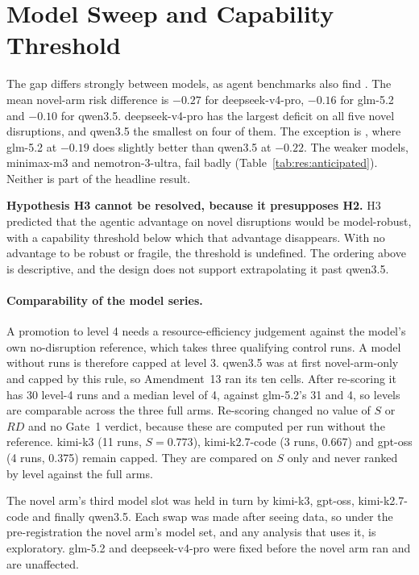 \section{Model Sweep and Capability Threshold}
\label{sec:res:models}

The gap differs strongly between models, as agent benchmarks also find
\parencite{xu2025}. The mean novel-arm risk
difference is $-0.27$ for deepseek-v4-pro, $-0.16$ for glm-5.2 and $-0.10$ for
qwen3.5. deepseek-v4-pro has the largest deficit on all five novel
disruptions, and qwen3.5 the smallest on four of them. The exception is
, where glm-5.2 at $-0.19$ does slightly
better than qwen3.5 at $-0.22$. The weaker models, minimax-m3 and
nemotron-3-ultra, fail badly (Table~\ref{tab:res:anticipated}). Neither is
part of the headline result.

\textbf{Hypothesis H3 cannot be resolved, because it presupposes H2.} H3
predicted that the agentic advantage on novel disruptions would be
model-robust, with a capability threshold below which that advantage
disappears. With no advantage to be robust or fragile, the threshold is
undefined. The ordering above is descriptive, and the design does not support
extrapolating it past qwen3.5.

\paragraph{Comparability of the model series.}
\label{sec:res:models:levelcap}
\label{sec:res:models:churn}
A promotion to level 4 needs a resource-efficiency judgement against the
model's own no-disruption reference, which takes three qualifying control runs.
A model without  runs is therefore capped at level 3.
qwen3.5 was at first novel-arm-only and capped by this rule, so Amendment~13
ran its ten  cells. After re-scoring it has 30 level-4 runs
and a median level of 4, against glm-5.2's 31 and 4, so levels are comparable
across the three full arms. Re-scoring changed no value of $S$ or $RD$ and no
Gate~1 verdict, because these are computed per run without the reference.
kimi-k3 (11 runs, $S = 0.773$), kimi-k2.7-code (3 runs, 0.667) and gpt-oss
(4 runs, 0.375) remain capped. They are compared on $S$ only and never ranked
by level against the full arms.

The novel arm's third model slot was held in turn by kimi-k3, gpt-oss,
kimi-k2.7-code and finally qwen3.5. Each swap was made after seeing data, so
under the pre-registration the novel arm's model set, and any analysis that
uses it, is exploratory. glm-5.2 and deepseek-v4-pro were fixed before the
novel arm ran and are unaffected.

